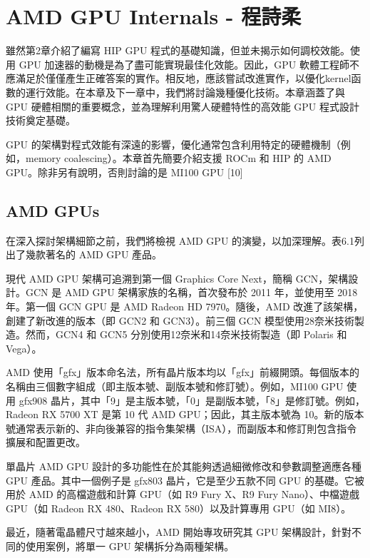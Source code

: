 \chapter{AMD GPU Internals - 程詩柔} \label{chap:AMD_GPU_internal}
雖然第2章介紹了編寫 HIP GPU 程式的基礎知識，但並未揭示如何調校效能。使用 GPU 加速器的動機是為了盡可能實現最佳化效能。因此，GPU 軟體工程師不應滿足於僅僅產生正確答案的實作。相反地，應該嘗試改進實作，以優化kernel函數的運行效能。在本章及下一章中，我們將討論幾種優化技術。本章涵蓋了與 GPU 硬體相關的重要概念，並為理解利用驚人硬體特性的高效能 GPU 程式設計技術奠定基礎。

\vspace{1em}
GPU 的架構對程式效能有深遠的影響，優化通常包含利用特定的硬體機制（例如，memory coalescing）。本章首先簡要介紹支援 ROCm 和 HIP 的 AMD GPU。除非另有說明，否則討論的是 MI100 GPU [10] 

\section{AMD GPUs}
在深入探討架構細節之前，我們將檢視 AMD GPU 的演變，以加深理解。表6.1列出了幾款著名的 AMD GPU 產品。

\vspace{1em}
現代 AMD GPU 架構可追溯到第一個 Graphics Core Next，簡稱 GCN，架構設計。GCN 是 AMD GPU 架構家族的名稱，首次發布於 2011 年，並使用至 2018 年。第一個 GCN GPU 是 AMD Radeon HD 7970。隨後，AMD 改進了該架構，創建了新改進的版本（即 GCN2 和 GCN3）。前三個 GCN 模型使用28奈米技術製造。然而，GCN4 和 GCN5 分別使用12奈米和14奈米技術製造（即 Polaris 和 Vega）。

\vspace{1em}
AMD 使用「gfx」版本命名法，所有晶片版本均以「gfx」前綴開頭。每個版本的名稱由三個數字組成（即主版本號、副版本號和修訂號）。例如，MI100 GPU 使用 gfx908 晶片，其中「9」是主版本號，「0」是副版本號，「8」是修訂號。例如，Radeon RX 5700 XT 是第 10 代 AMD GPU；因此，其主版本號為 10。新的版本號通常表示新的、非向後兼容的指令集架構（ISA），而副版本和修訂則包含指令擴展和配置更改。

\vspace{1em}
單晶片 AMD GPU 設計的多功能性在於其能夠透過細微修改和參數調整適應各種 GPU 產品。其中一個例子是 gfx803 晶片，它是至少五款不同 GPU 的基礎。它被用於 AMD 的高檔遊戲和計算 GPU（如 R9 Fury X、R9 Fury Nano）、中檔遊戲 GPU（如 Radeon RX 480、Radeon RX 580）以及計算專用 GPU（如 MI8）。

\vspace{1em}
最近，隨著電晶體尺寸越來越小，AMD 開始專攻研究其 GPU 架構設計，針對不同的使用案例，將單一 GPU 架構拆分為兩種架構。

